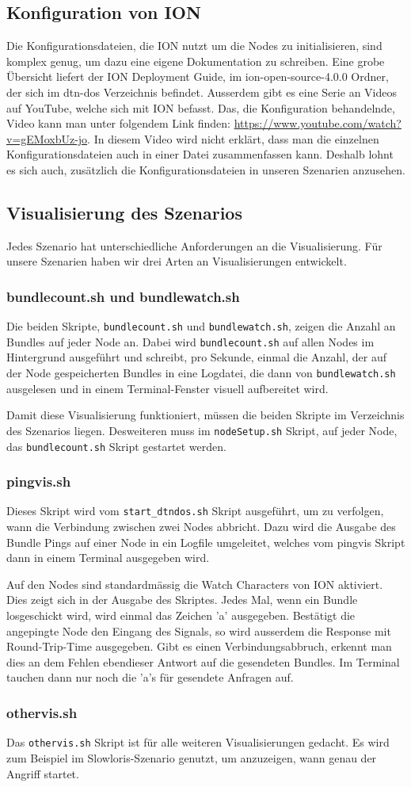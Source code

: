 \documentclass{article}
\begin{document}
\subsection{Konfiguration von ION}
Die Konfigurationsdateien, die ION nutzt um die Nodes zu initialisieren, sind komplex genug, um dazu eine eigene Dokumentation zu schreiben. Eine grobe Übersicht liefert der ION Deployment Guide, im ion-open-source-4.0.0 Ordner, der sich im dtn-dos Verzeichnis befindet. Ausserdem gibt es eine Serie an Videos auf YouTube, welche sich mit ION befasst. Das, die Konfiguration behandelnde, Video kann man unter folgendem Link finden: \url{https://www.youtube.com/watch?v=gEMoxbUz-jo}. In diesem Video wird nicht erklärt, dass man die einzelnen Konfigurationsdateien auch in einer Datei zusammenfassen kann. Deshalb lohnt es sich auch, zusätzlich die Konfigurationsdateien in unseren Szenarien anzusehen.  
\subsection{Visualisierung des Szenarios}\label{visualisierung}
Jedes Szenario hat unterschiedliche Anforderungen an die Visualisierung. Für unsere Szenarien haben wir drei Arten an Visualisierungen entwickelt. 
\subsubsection{bundlecount.sh und bundlewatch.sh}
Die beiden Skripte, \texttt{bundlecount.sh} und \texttt{bundlewatch.sh}, zeigen die Anzahl an Bundles auf jeder Node an. Dabei wird \texttt{bundlecount.sh} auf allen Nodes im Hintergrund ausgeführt und schreibt, pro Sekunde, einmal die Anzahl, der auf der Node gespeicherten Bundles in eine Logdatei, die dann von \texttt{bundlewatch.sh} ausgelesen und in einem Terminal-Fenster visuell aufbereitet wird.\par
Damit diese Visualisierung funktioniert, müssen die beiden Skripte im Verzeichnis des Szenarios liegen. Desweiteren muss im \texttt{nodeSetup.sh} Skript, auf jeder Node, das \texttt{bundlecount.sh} Skript gestartet werden.
\subsubsection{pingvis.sh}
Dieses Skript wird vom \texttt{start\_dtndos.sh} Skript ausgeführt, um zu verfolgen, wann die Verbindung zwischen zwei Nodes abbricht. Dazu wird die Ausgabe des Bundle Pings auf einer Node in ein Logfile umgeleitet, welches vom pingvis Skript dann in einem Terminal ausgegeben wird.\par
Auf den Nodes sind standardmässig die Watch Characters von ION aktiviert. Dies zeigt sich in der Ausgabe des Skriptes. Jedes Mal, wenn ein Bundle losgeschickt wird, wird einmal das Zeichen 'a' ausgegeben. Bestätigt die angepingte Node den Eingang des Signals, so wird ausserdem die Response mit  Round-Trip-Time ausgegeben. Gibt es einen Verbindungsabbruch, erkennt man dies an dem Fehlen ebendieser Antwort auf die gesendeten Bundles. Im Terminal tauchen dann nur noch die 'a's für gesendete Anfragen auf. 
\subsubsection{othervis.sh}
Das \texttt{othervis.sh} Skript ist für alle weiteren Visualisierungen gedacht. Es wird zum Beispiel im Slowloris-Szenario genutzt, um anzuzeigen, wann genau der Angriff startet. 
\newpage
\printbibliography
\end{document}
